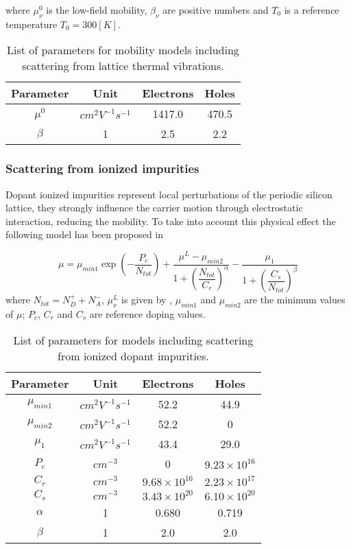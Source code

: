 where $\mu_\nu^0$ is the low-field mobility, $\beta_\nu$ are positive numbers and $T_0$ is a reference temperature $T_0=300[K]$.

\begin{table}[!h]
\centering
\begin{tabular}{cccc}
\toprule
Parameter & Unit & Electrons & Holes \\
\midrule
$\mu^0$ & $cm^2V^{-1}s^{-1}$ & 1417.0 & 470.5\\
$\beta$ & 1 & 2.5 & 2.2\\
\bottomrule
\end{tabular}
\caption{List of parameters for mobility models including scattering from lattice thermal vibrations.}
\end{table}

\subsubsection{Scattering from ionized impurities}

Dopant ionized impurities represent local perturbations of the periodic silicon lattice, they strongly influence the carrier motion through electrostatic interaction, reducing the mobility. To take into account this physical effect the following model has been proposed in \cite{Masetti:MobDop}


\begin{equation}
\label{eq: mobility impurities}
\mu = \mu_{min1}\exp\left( 	- \dfrac{P_c}{N_{tot}}\right)
 + \dfrac{\mu^L-\mu_{min2}}{1 + \left( \dfrac{N_{tot}}{C_r} \right)^{\alpha} } 
 - \dfrac{\mu_1}{1 + \left( \dfrac{C_s}{N_{tot}} \right)^{\beta} } 
\end{equation}
where $N_{tot} = N_D^+ + N_A^-$, $\mu_\nu^L$ is given by , $\mu_{min1}$ and $\mu_{min2}$  are the minimum values of $\mu$; $P_c$, $C_r$ and $C_s$ are reference doping values.


\begin{table}[!h]
\centering
\begin{tabular}{cccc}
\toprule
Parameter & Unit & Electrons & Holes \\
\midrule
$\mu_{min1}$ & $cm^2V^{-1}s^{-1}$ & 52.2 & 44.9\\
$\mu_{min2}$ & $cm^2V^{-1}s^{-1}$ & 52.2 & 0\\
$\mu_1$ & $cm^2V^{-1}s^{-1}$ & 43.4 & 29.0 \\
$P_c$ & $cm^{-3}$ & 0 & $9.23\times 10^{16}$\\
$C_r$ & $cm^{-3}$ &  $9.68\times 10^{16}$ & $2.23\times 10^{17}$ \\
$C_s$ & $cm^{-3}$ & $3.43\times 10^{20}$ & $6.10\times 10^{20}$\\
$\alpha$& 1 & 0.680 & 0.719  \\
$\beta$& 1 & 2.0 & 2.0 \\
\bottomrule
\end{tabular}
\caption{List of parameters for models including scattering from ionized dopant impurities.}
\end{table}


